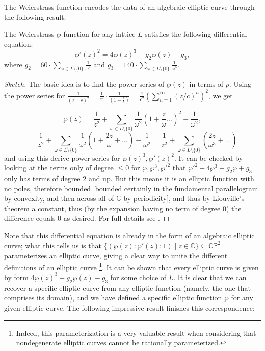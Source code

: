 The Weierstrass function encodes the data of an algebraic elliptic curve through the following result:

\begin{proposition}
    The Weierstrass $\wp$-function for any lattice $L$ satisfies the following differential equation:
\[\wp' (z)^2 = 4 \wp(z)^3 - g_2 \wp(z)- g_3,\]where $g_2 = 60 \cdot \sum_{\omega \in L \setminus \{ 0\}} \frac{1}{\omega^4}$ and $g_3 = 140 \cdot \sum_{\omega \in L \setminus \{ 0\}} \frac{1}{\omega^6}$. 
\end{proposition}

\begin{proof}[Sketch]
    The basic idea is to find the power series of $\wp(z)$ in terms of $p$. Using the power series for $\frac{1}{(z - c)^2} = \frac{1}{c^2} \cdot \frac{1}{(1 - \frac{z}{c})} = \frac{1}{c^2} (\sum_{n=1}^\infty  (z/c)^{n})^2$, we get

\[\wp(z) = \frac{1}{z^2} + \sum_{\omega \in L \setminus \{ 0\}} \frac{1}{\omega^2} \left( 1 + \frac{z}{\omega} \dots \right)^2 - \frac{1}{\omega^2},\]
\[ = \frac{1}{z^2} + \sum_{\omega \in L \setminus \{ 0\}} \frac{1}{\omega^2} \left( 1 + \frac{2 z}{\omega} + \dots \right) - \frac{1}{\omega^2}  = \frac{1}{z^2} + \sum_{\omega \in L \setminus \{ 0\}} \left( \frac{2z}{\omega^3} + \dots\right) \]
and using this derive power series for $\wp(z)^3, \wp'(z)^2$. It can be checked by looking at the terms only of degree $\leq 0$ for $\wp, \wp^3, \wp'^2$ that $\wp'^2 - 4 \wp^3 + g_2 \wp + g_3$ only has terms of degree $2$ and up. But this means it is an elliptic function with no poles, therefore bounded [bounded certainly in the fundamental parallelogram by convexity, and then across all of $\mathbb{C}$ by periodicity], and thus by Liouville's theorem a constant, thus (by the expansion having no term of degree $0$) the difference equals $0$ as desired. For full details see \cite{Lang_1987}.
\end{proof}

Note that this differential equation is already in the form of an algebraic elliptic curve; what this tells us is that $ \{ (\wp(z): \wp'(z): 1) \mid z \in \mathbb{C} \} \subseteq \mathbb{CP}^2$ parameterizes an elliptic curve, giving a clear way to unite the different definitions of an elliptic curve \footnote{Indeed, this parameterization is a very valuable result when considering that nondegenerate elliptic curves cannot be rationally parameterized.}. It can be shown that every elliptic curve is given by form $4 \wp(z)^3 - g_2 \wp(z)- g_3$ for some choice of $L$. It is clear that we can recover a specific elliptic curve from any elliptic function (namely, the one that comprises its domain), and we have defined a specific elliptic function $\wp$ for any given elliptic curve. The following impressive result finishes this correspondence:

